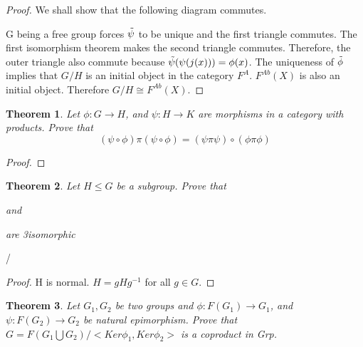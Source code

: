 \documentclass{article}
\theoremstyle{plain}
\newtheorem{theorem}{Theorem}
\theoremstyle{definition}
\begin{document}
\begin{proof}
We shall show that the following diagram commutes. 


G being a free group forces $\Tilde{\psi}$ to be unique and the first triangle commutes. The first isomorphism theorem makes the second triangle commutes. Therefore, the outer triangle also commute because $\Tilde{\psi}(\psi(j(x))) = \phi(x)$. The uniqueness of $\Tilde{\phi}$ implies that $G/H$ is an initial object in the category $F^{A}$. $F^{Ab}(X)$ is also an initial object. Therefore $G/H \cong F^{Ab}(X)$.

\end{proof}

\begin{theorem}
Let $\phi: G \to H$, and $\psi: H \to K$ are morphisms in a category with products. Prove that $$ (\psi \circ \phi) \pi (\psi \circ \phi) = ( \psi \pi \psi) \circ (\phi \pi \phi)$$
\end{theorem}

\begin{proof}

\end{proof}
\begin{theorem}
Let $H \leq G$ be a subgroup. Prove that 

 and 

 are 3isomorphic
\end{theorem}/   
\begin{proof}
H is normal. $H = gHg^{-1}$ for all $g \in G$. 
\end{proof}

\begin{theorem}
Let $G_{1},G_{2}$ be two groups and $\phi: F(G_{1}) \to G_{1}$, and $\psi: F(G_{2}) \to G_{2}$ be natural epimorphism. Prove that $G = F(G_{1} \bigcup G_{2})/< Ker \phi_{1}, Ker\phi_{2}>$ is a coproduct in Grp.
\end{theorem}
\end{document}

